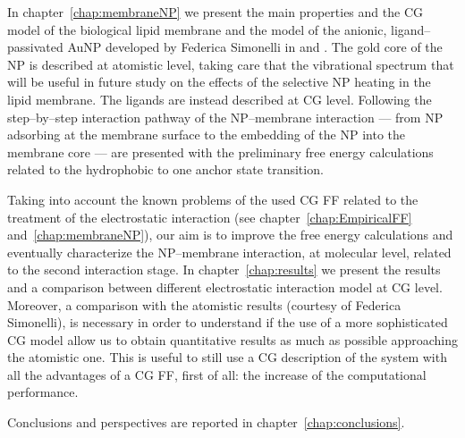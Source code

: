 In chapter~\ref{chap:membraneNP} we present the main properties and the \ac{CG} model of the biological lipid membrane and the model of the anionic, ligand--passivated \ac{AuNP} developed by Federica Simonelli \etal in \cite{simonelliThesis} and \cite{ourPaper}. The gold core of the \ac{NP} is described at atomistic level, taking care that the vibrational spectrum that will be useful in future study on the effects of the selective \ac{NP} heating in the lipid membrane. The ligands are instead described at \ac{CG} level.
Following the step--by--step interaction pathway of the \ac{NP}--membrane interaction --- from \ac{NP} adsorbing at the membrane surface to the embedding of the \ac{NP} into the membrane core --- are presented with the preliminary free energy calculations related to the hydrophobic to one anchor state transition.

Taking into account the known problems of the used \ac{CG} \ac{FF} related to the treatment of the electrostatic interaction (see chapter~\ref{chap:EmpiricalFF} and~\ref{chap:membraneNP}), our aim is to improve the free energy calculations and eventually characterize the \ac{NP}--membrane interaction, at molecular level, related to the second interaction stage. In chapter~\ref{chap:results} we present the results and a comparison between different electrostatic interaction model at \ac{CG} level. Moreover, a comparison with the atomistic results (courtesy of Federica Simonelli), is necessary in order to understand if the use of a more sophisticated \ac{CG} model allow us to obtain quantitative results as much as possible approaching the atomistic one. This is useful to still use a \ac{CG} description of the system with all the advantages of a \ac{CG} \ac{FF}, first of all: the increase of the computational performance.

Conclusions and perspectives are reported in chapter~\ref{chap:conclusions}.


\restoretoc
\endgroup
